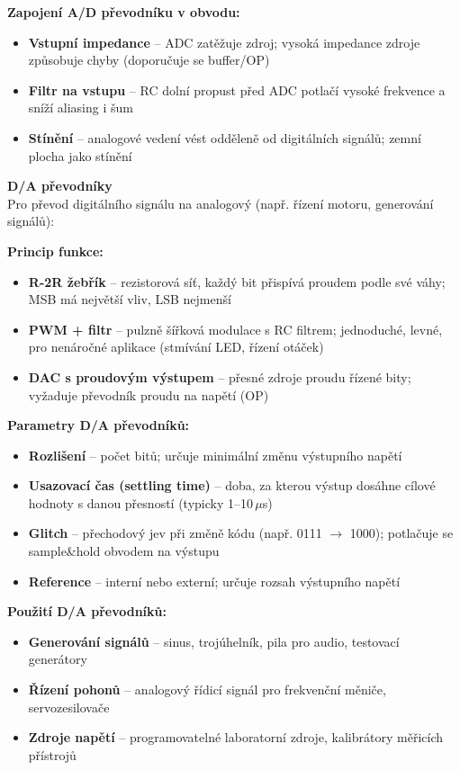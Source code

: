 \documentclass[a4paper,10pt]{article}
\begin{document}
\begin{vysvetlenibox}
\textbf{Zapojení A/D převodníku v obvodu:}
\begin{itemize}[noitemsep, leftmargin=1.4em, topsep=4pt]
    \item \textbf{Vstupní impedance} -- ADC zatěžuje zdroj; vysoká impedance zdroje
          způsobuje chyby (doporučuje se buffer/OP)
    \item \textbf{Filtr na vstupu} -- RC dolní propust před ADC potlačí vysoké frekvence
          a sníží aliasing i šum
    \item \textbf{Stínění} -- analogové vedení vést odděleně od digitálních signálů;
          zemní plocha jako stínění
\end{itemize}

\textbf{D/A převodníky}\\
Pro převod digitálního signálu na analogový (např. řízení motoru, generování signálů):

\textbf{Princip funkce:}
\begin{itemize}[noitemsep, leftmargin=1.4em, topsep=4pt]
    \item \textbf{R-2R žebřík} -- rezistorová síť, každý bit přispívá proudem
          podle své váhy; MSB má největší vliv, LSB nejmenší
    \item \textbf{PWM + filtr} -- pulzně šířková modulace s RC filtrem;
          jednoduché, levné, pro nenáročné aplikace (stmívání LED, řízení otáček)
    \item \textbf{DAC s proudovým výstupem} -- přesné zdroje proudu řízené bity;
          vyžaduje převodník proudu na napětí (OP)
\end{itemize}

\textbf{Parametry D/A převodníků:}
\begin{itemize}[noitemsep, leftmargin=1.4em, topsep=4pt]
    \item \textbf{Rozlišení} -- počet bitů; určuje minimální změnu výstupního napětí
    \item \textbf{Usazovací čas (settling time)} -- doba, za kterou výstup dosáhne
          cílové hodnoty s danou přesností (typicky 1--10\,$\mu$s)
    \item \textbf{Glitch} -- přechodový jev při změně kódu (např. 0111 $\to$ 1000);
          potlačuje se sample\&hold obvodem na výstupu
    \item \textbf{Reference} -- interní nebo externí; určuje rozsah výstupního napětí
\end{itemize}

\textbf{Použití D/A převodníků:}
\begin{itemize}[noitemsep, leftmargin=1.4em, topsep=4pt]
    \item \textbf{Generování signálů} -- sinus, trojúhelník, pila pro audio,
          testovací generátory
    \item \textbf{Řízení pohonů} -- analogový řídicí signál pro frekvenční měniče,
          servozesilovače
    \item \textbf{Zdroje napětí} -- programovatelné laboratorní zdroje,
          kalibrátory měřicích přístrojů
\end{itemize}


\end{vysvetlenibox}
\end{document}
